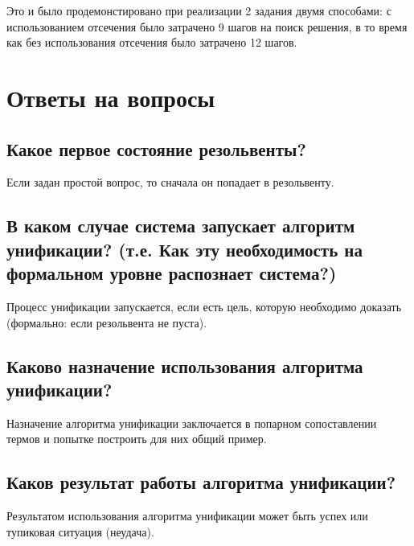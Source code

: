 \documentclass[a4paper,12pt]{article}
\begin{document}
	

	Это и было продемонстировано при реализации 2 задания двумя способами: с использованием отсечения было затрачено 9 шагов на поиск решения, в то время как без использования отсечения было затрачено 12 шагов.

	

	\newpage

	

	\section*{Ответы на вопросы}

	

	\subsection*{Какое первое состояние резольвенты?}

	

	Если задан простой вопрос, то сначала он попадает в резольвенту.

	

	\subsection*{В каком случае система запускает алгоритм унификации? (т.е. Как эту необходимость на формальном уровне распознает система?)}

	

	Процесс унификации запускается, если есть цель, которую необходимо доказать (формально: если резольвента не пуста).

	

	\subsection*{Каково назначение использования алгоритма унификации? }

	

	Назначение алгоритма унификации заключается в попарном сопоставлении термов и попытке построить для них общий пример. 

	

	\subsection*{Каков результат работы алгоритма унификации? }

	

	Результатом использования алгоритма унификации может быть успех или тупиковая ситуация (неудача).
\end{document}
